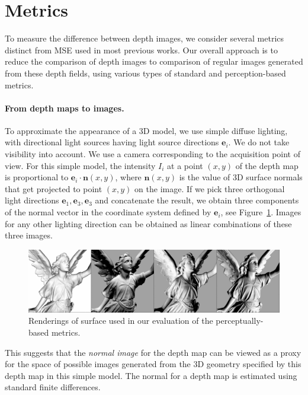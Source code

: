 \newcommand{\be}{\mathbf{e}}
\newcommand{\bn}{\mathbf{n}}
\newcommand{\bx}{\mathbf{x}}

\section{Metrics}
\label{sec:metrics}
To measure the difference between depth images, we consider several metrics distinct from MSE used in most previous works. 
Our overall approach is to reduce the comparison of depth images to comparison of regular images generated from these depth fields, using various types of standard and perception-based metrics.

\paragraph{From depth maps to images.}  To approximate the appearance of a 3D model, we use  simple diffuse lighting, with directional light sources 
having light source directions $\bm{e}_i$. We do not take visibility into account. We use a camera corresponding to the acquisition point of view. For this simple model, the intensity $I_i$ at a point $(x,y)$ of the depth map is proportional to $\bm{e}_i \cdot \bm{n}(x,y)$, where $\bm{n}(x, y)$ is the value of 3D surface normals that get projected to point $(x,y)$ on the image. If we pick three orthogonal light directions $\bm{e}_1, \bm{e}_3, \bm{e}_3$ and concatenate the result, we obtain three components of the normal vector in the coordinate system defined by $\bm{e}_i$, see Figure~\ref{fig:normals_directions}. Images for any other lighting direction can be obtained as linear combinations of these three images. 

\begin{figure}[t]
\begin{center}
\includegraphics[width=0.95\columnwidth]{Figures/depth_superresolution/renderings.lucy.png}
\end{center}
   \caption{Renderings of surface used in our evaluation of the perceptually-based metrics.
   }
\label{fig:normals_directions}
\end{figure}

This suggests that the \emph{normal image} for the depth map can be viewed as a proxy for the space of possible images generated from the 3D geometry specified by this depth map in this simple model.  The normal for a depth map is estimated using standard finite differences.

